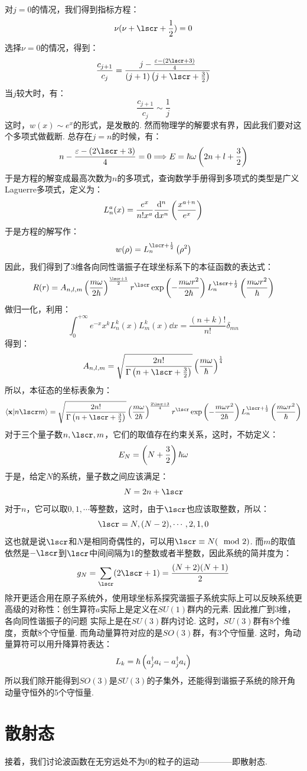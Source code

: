 对\(j=0\)的情况，我们得到指标方程：
\[
\nu(\nu + \lscr+\frac{1}{2}) = 0 
\]
选择\(\nu=0\)的情况，得到：
\[
\frac{c_{j+1}}{c_{j}} = \frac{j - \frac{\varepsilon-(2\lscr+3)}{4}}{(j+1)\br{j+\lscr+\frac{3}{2}}}
\]
当\(j\)较大时，有：
\[
\frac{c_{j+1}}{c_{j}}\sim \frac{1}{j}
\]
这时，\(w(x)\sim e^{x}\)的形式，是发散的. 然而物理学的解要求有界，因此我们要对这个多项式做截断. 总存在\(j=n\)的时候，有：
\[
n - \frac{\varepsilon - (2\lscr + 3)}{4} = 0 \Longrightarrow E = \hh\omega\br{2n + l + \frac{3}{2}}
\]
于是方程的解变成最高次数为\(n\)的多项式，查询数学手册得到多项式的类型是广义Laguerre多项式，定义为：
\[
L_{n}^{a}(x) = \frac{e^{x}}{n!x^{a}}\frac{\dd^n}{\dd x^n}\left({\frac{x^{a+n}}{e^{x}}}\right)
\]
于是方程的解写作：
\[
w(\rho) = L_{n}^{\lscr+\frac{1}{2}}\br{\rho^{2}}
\]
因此，我们得到了3维各向同性谐振子在球坐标系下的本征函数的表达式：
\[
\Rcal(r) = A_{n,l,m}\br{\frac{m\omega}{2\hh}}^{\frac{\lscr+1}{2}}r^{\lscr}\exp\br{-\frac{m\omega r^2}{2\hh}}L_{n}^{\lscr+\frac{1}{2}}\br{\frac{m\omega r^2}{\hh}}
\]
做归一化，利用：
\[
\int_{0}^{+\infty}e^{-x}x^{k}L_{n}^{k}(x)L_{m}^{k}(x)\dd{x} = \frac{(n+k)!}{n!}\delta_{mn}
\]
得到：
\[
A_{n,l,m} = \sqrt{\frac{2n!}{\Gamma\br{n+\lscr+\frac{3}{2}}}}\br{\frac{m\omega}{\hh}}^{\frac{1}{4}}
\]
所以，本征态的坐标表象为：
\[
\bra{\vr}\ket{n\lscr m} = \sqrt{\frac{2n!}{\Gamma\br{n+\lscr+\frac{3}{2}}}}\br{\frac{m\omega}{2\hh}}^{\frac{2\lscr+3}{4}}r^{\lscr}\exp\br{-\frac{m\omega r^2}{2\hh}}L_{n}^{\lscr+\frac{1}{2}}\br{\frac{m\omega r^2}{\hh}}
\]
对于三个量子数\(n,\lscr,m\)，它们的取值存在约束关系，这时，不妨定义：
\[
E_{N} = \left({N+\frac{3}{2}}\right)\hbar\omega 
\]
于是，给定\(N\)的系统，量子数之间应该满足：
\[
N = 2n + \lscr
\]
对于\(n\)，它可以取\(0,1,\cdots\)等整数，这时，由于\(\lscr\)也应该取整数，所以：
\[
\lscr = N, (N-2), \cdots, 2, 1, 0
\]
这也就是说\(\lscr\)和\(N\)是相同奇偶性的，可以用\(\lscr\equiv N(\mod 2)\). 而\(m\)的取值依然是\(-\lscr\)到\(\lscr\)中间间隔为1的整数或者半整数，因此系统的简并度为：
\[
g_{N} = \sum_{\lscr}(2\lscr + 1) = \frac{(N+2)(N+1)}{2}
\]
除开更适合用在原子系统外，使用球坐标系探究谐振子系统实际上可以反映系统更高级的对称性：创生算符\(a\)实际上是定义在\(SU(1)\)群内的元素. 因此推广到3维，各向同性谐振子的问题
实际上是在\(SU(3)\)群内讨论. 这时，\(SU(3)\)群有8个维度，贡献8个守恒量. 而角动量算符对应的是\(SO(3)\)群，有3个守恒量. 这时，角动量算符可以用升降算符表达：
\[
L_{k} = \hbar\left({a_{j}^{\dagger}a_{i} - a^{\dagger}_{j}a_{i}}\right)
\]
所以我们除开能得到\(SO(3)\)是\(SU(3)\)的子集外，还能得到谐振子系统的除开角动量守恒外的5个守恒量. 
\section{散射态}
接着，我们讨论波函数在无穷远处不为0的粒子的运动————即散射态. 
